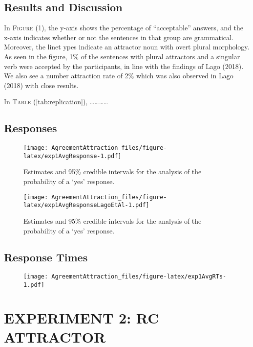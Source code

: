 \documentclass[doc]{apa6}
\begin{document}
\subsection{Results and Discussion}\label{results-and-discussion}

In \textsc{Figure} (1), the y-axis shows the percentage of
``acceptable'' answers, and the x-axis indicates whether or not the
sentences in that group are grammatical. Moreover, the linet ypes
indicate an attractor noun with overt plural morphology. As seen in the
figure, 1\% of the sentences with plural attractors and a singular verb
were accepted by the participants, in line with the findings of Lago
(2018). We also see a number attraction rate of 2\% which was also
observed in Lago (2018) with close results.

In \textsc{Table} (\ref{tab:replication}),
\ldots{}\ldots{}\ldots{}\ldots{}

\subsection{Responses}\label{responses}

\begin{figure}
\centering
\texttt{[image: AgreementAttraction\_files/figure-latex/exp1AvgResponse-1.pdf]}
\caption{\label{fig:exp1AvgResponse}Estimates and 95\% credible intervals
for the analysis of the probability of a `yes' response.}
\end{figure}

\begin{figure}
\centering
\texttt{[image: AgreementAttraction\_files/figure-latex/exp1AvgResponseLagoEtAl-1.pdf]}
\caption{\label{fig:exp1AvgResponseLagoEtAl}Estimates and 95\% credible
intervals for the analysis of the probability of a `yes' response.}
\end{figure}

\subsection{Response Times}\label{response-times}

\begin{figure}
\centering
\texttt{[image: AgreementAttraction\_files/figure-latex/exp1AvgRTs-1.pdf]}
\caption{}
\end{figure}

\clearpage

\section{EXPERIMENT 2: RC ATTRACTOR}\label{experiment-2-rc-attractor}
\end{document}
